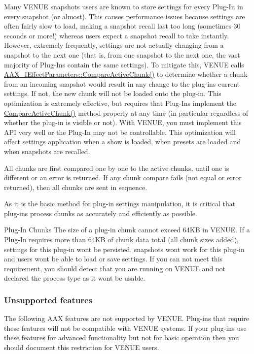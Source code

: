  Many V\+E\+N\+U\+E snapshots users are known to store settings for every Plug-\/\+In in every snapshot (or almost). This causes performance issues because settings are often fairly slow to load, making a snapshot recall last too long (sometimes 30 seconds or more!) whereas users expect a snapshot recall to take instantly. However, extremely frequently, settings are not actually changing from a snapshot to the next one (that is, from one snapshot to the next one, the vast majority of Plug-\/\+Ins contain the same settings). To mitigate this, V\+E\+N\+U\+E calls \hyperlink{a00061_a1e86f849e970c9998313fc7d451ccf85}{A\+A\+X\+\_\+\+I\+Effect\+Parameters\+::\+Compare\+Active\+Chunk()} to determine whether a chunk from an incoming snapshot would result in any change to the plug-\/in\textquotesingle{}s current settings. If not, the new chunk will not be loaded onto the plug-\/in. This optimization is extremely effective, but requires that Plug-\/\+Ins implement the \hyperlink{a00061_a1e86f849e970c9998313fc7d451ccf85}{Compare\+Active\+Chunk()} method properly at any time (in particular regardless of whether the plug-\/in is visible or not). With V\+E\+N\+U\+E, you must implement this A\+P\+I very well or the Plug-\/\+In may not be controllable. This optimization will affect settings application when a show is loaded, when presets are loaded and when snapshots are recalled.

 All chunks are first compared one by one to the active chunks, until one is different or an error is returned. If any chunk compare fails (not equal or error returned), then all chunks are sent in sequence.

 As it is the basic method for plug-\/in settings manipulation, it is critical that plug-\/ins process chunks as accurately and efficiently as possible.

 Plug-\/\+In Chunks The size of a plug-\/in chunk cannot exceed 64\+K\+B in V\+E\+N\+U\+E. If a Plug-\/\+In requires more than 64\+K\+B of chunk data total (all chunk sizes added), settings for this plug-\/in won\textquotesingle{}t be persisted, snapshots won\textquotesingle{}t work for this plug-\/in and users won\textquotesingle{}t be able to load or save settings. If you can not meet this requirement, you should detect that you are running on V\+E\+N\+U\+E and not declared the process type as it won\textquotesingle{}t be usable.

\hypertarget{a00377_subsection__aax_venue_guide__features__unsupported}{}\subsubsection{Unsupported features}\label{a00377_subsection__aax_venue_guide__features__unsupported}
 The following A\+A\+X features are not supported by V\+E\+N\+U\+E. Plug-\/ins that require these features will not be compatible with V\+E\+N\+U\+E systems. If your plug-\/ins use these features for advanced functionality but not for basic operation then you should document this restriction for V\+E\+N\+U\+E users.

